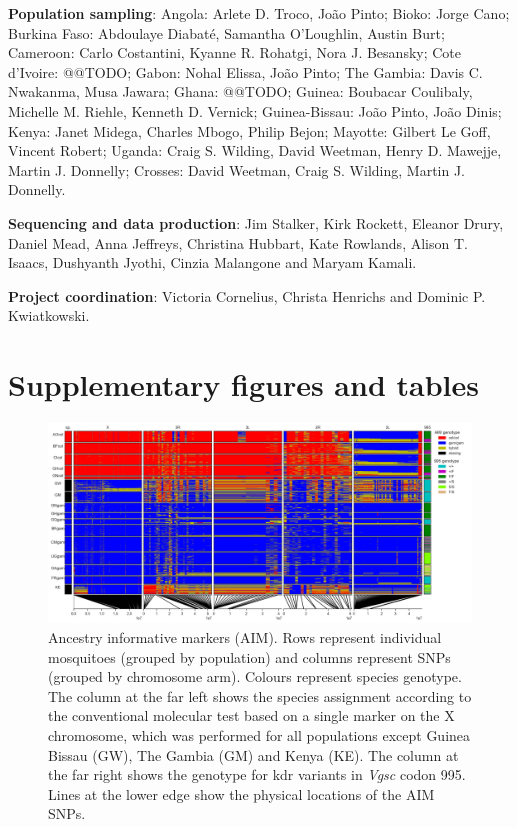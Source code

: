 \documentclass[a4paper,11pt,abstracton,hidelinks]{scrartcl}
\newcommand{\beginsupplement}{%
  \setcounter{table}{0}
  \renewcommand{\thetable}{S\arabic{table}}%
  \setcounter{figure}{0}
  \renewcommand{\thefigure}{S\arabic{figure}}%
}
\begin{document}
%
\textbf{Population sampling}: Angola: Arlete D. Troco, Jo\~{a}o Pinto; Bioko: Jorge Cano; Burkina Faso: Abdoulaye Diabat\'{e}, Samantha O'Loughlin, Austin Burt; Cameroon: Carlo Costantini, Kyanne R. Rohatgi, Nora J. Besansky; Cote d'Ivoire: @@TODO; Gabon: Nohal Elissa, Jo\~{a}o Pinto; The Gambia: Davis C. Nwakanma, Musa Jawara; Ghana: @@TODO; Guinea: Boubacar Coulibaly, Michelle M. Riehle, Kenneth D. Vernick; Guinea-Bissau: Jo\~{a}o Pinto, Jo\~{a}o Dinis; Kenya: Janet Midega, Charles Mbogo, Philip Bejon; Mayotte: Gilbert Le Goff, Vincent Robert; Uganda: Craig S. Wilding, David Weetman, Henry D. Mawejje, Martin J. Donnelly; Crosses: David Weetman, Craig S. Wilding, Martin J. Donnelly.

%
\textbf{Sequencing and data production}: Jim Stalker, Kirk Rockett, Eleanor Drury, Daniel Mead, Anna Jeffreys, Christina Hubbart, Kate Rowlands, Alison T. Isaacs, Dushyanth Jyothi, Cinzia Malangone and Maryam Kamali.

%
\textbf{Project coordination}: Victoria Cornelius, Christa Henrichs and Dominic P. Kwiatkowski.


\beginsupplement


\clearpage

\section*{Supplementary figures and tables}

\begin{figure}[H]
	\begin{center}
		\includegraphics*[width=6.3in]{artwork/AIM_figure_scaled.jpg}
	\end{center}
	\caption{Ancestry informative markers (AIM). Rows represent individual mosquitoes (grouped by population) and columns represent SNPs (grouped by chromosome arm). Colours represent species genotype. The column at the far left shows the species assignment according to the conventional molecular test based on a single marker on the X chromosome, which was performed for all populations except Guinea Bissau (GW), The Gambia (GM) and Kenya (KE). The column at the far right shows the genotype for kdr variants in \textit{Vgsc} codon 995. Lines at the lower edge show the physical locations of the AIM SNPs.}
	\label{fig:aim}
\end{figure}
\end{document}
